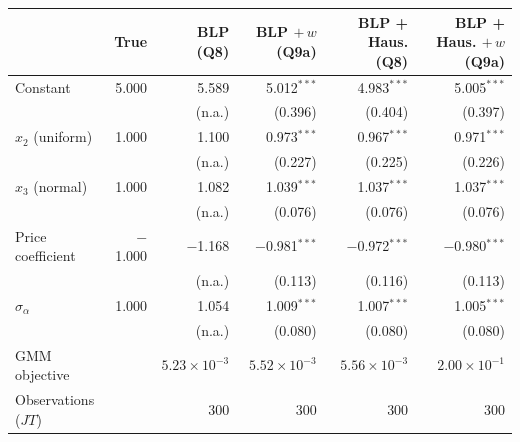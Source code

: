 \begin{tabular}{lrrrrr}
\toprule
 & True & BLP (Q8) & BLP $+\,w$ (Q9a) & BLP + Haus. (Q8) & BLP + Haus. $+\,w$ (Q9a) \\
\midrule
Constant & 5.000 & 5.589 & 5.012$^{***}$ & 4.983$^{***}$ & 5.005$^{***}$ \\
 &  & (n.a.) & (0.396) & (0.404) & (0.397) \\
$x_2$ (uniform) & 1.000 & 1.100 & 0.973$^{***}$ & 0.967$^{***}$ & 0.971$^{***}$ \\
 &  & (n.a.) & (0.227) & (0.225) & (0.226) \\
$x_3$ (normal) & 1.000 & 1.082 & 1.039$^{***}$ & 1.037$^{***}$ & 1.037$^{***}$ \\
 &  & (n.a.) & (0.076) & (0.076) & (0.076) \\
Price coefficient & $-$1.000 & $-$1.168 & $-$0.981$^{***}$ & $-$0.972$^{***}$ & $-$0.980$^{***}$ \\
 &  & (n.a.) & (0.113) & (0.116) & (0.113) \\
$\sigma_\alpha$ & 1.000 & 1.054 & 1.009$^{***}$ & 1.007$^{***}$ & 1.005$^{***}$ \\
 &  & (n.a.) & (0.080) & (0.080) & (0.080) \\
\midrule
GMM objective &  & $5.23\times10^{-3}$ & $5.52\times10^{-3}$ & $5.56\times10^{-3}$ & $2.00\times10^{-1}$ \\
Observations ($JT$) &  & 300 & 300 & 300 & 300 \\
\bottomrule
\end{tabular}
